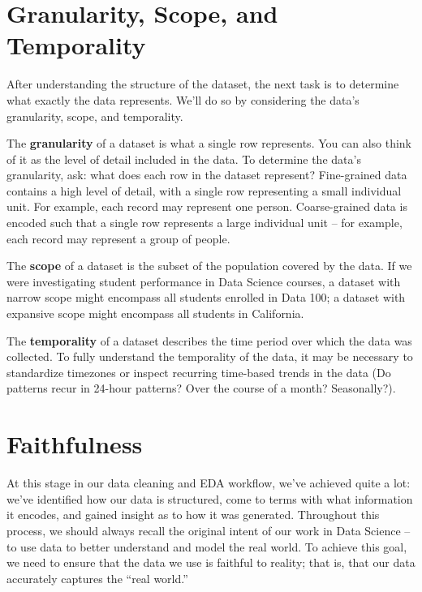 \documentclass[
  letterpaper,
  DIV=11,
  numbers=noendperiod]{scrreprt}
\begin{document}
\hypertarget{granularity-scope-and-temporality}{%
\section{Granularity, Scope, and
Temporality}\label{granularity-scope-and-temporality}}

After understanding the structure of the dataset, the next task is to
determine what exactly the data represents. We'll do so by considering
the data's granularity, scope, and temporality.

The \textbf{granularity} of a dataset is what a single row represents.
You can also think of it as the level of detail included in the data. To
determine the data's granularity, ask: what does each row in the dataset
represent? Fine-grained data contains a high level of detail, with a
single row representing a small individual unit. For example, each
record may represent one person. Coarse-grained data is encoded such
that a single row represents a large individual unit -- for example,
each record may represent a group of people.

The \textbf{scope} of a dataset is the subset of the population covered
by the data. If we were investigating student performance in Data
Science courses, a dataset with narrow scope might encompass all
students enrolled in Data 100; a dataset with expansive scope might
encompass all students in California.

The \textbf{temporality} of a dataset describes the time period over
which the data was collected. To fully understand the temporality of the
data, it may be necessary to standardize timezones or inspect recurring
time-based trends in the data (Do patterns recur in 24-hour patterns?
Over the course of a month? Seasonally?).

\hypertarget{faithfulness}{%
\section{Faithfulness}\label{faithfulness}}

At this stage in our data cleaning and EDA workflow, we've achieved
quite a lot: we've identified how our data is structured, come to terms
with what information it encodes, and gained insight as to how it was
generated. Throughout this process, we should always recall the original
intent of our work in Data Science -- to use data to better understand
and model the real world. To achieve this goal, we need to ensure that
the data we use is faithful to reality; that is, that our data
accurately captures the ``real world.''
\end{document}
